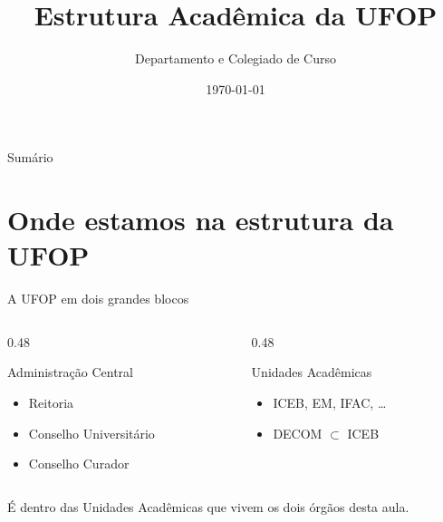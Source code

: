 \documentclass[aspectratio=169]{beamer}
\title{Estrutura Acadêmica da UFOP}
\author{Departamento e Colegiado de Curso}
\date{\today}
\newcommand{\ntc}[1]{\textcolor{mprimary}{#1}}
\begin{document}
\begin{frame}[plain]\titlepage\end{frame}

\begin{frame}{Sumário}
  \tableofcontents
\end{frame}

\section{Onde estamos na estrutura da UFOP}

\begin{frame}{A UFOP em dois grandes blocos}
  \begin{columns}[T,onlytextwidth]
    \begin{column}{0.48\textwidth}
      \begin{block}{Administração Central}
        \begin{itemize}
          \item Reitoria
          \item Conselho Universitário
          \item Conselho Curador
        \end{itemize}
      \end{block}
    \end{column}
    \begin{column}{0.48\textwidth}
      \begin{block}{Unidades Acadêmicas}
        \begin{itemize}
          \item ICEB, EM, IFAC, \ldots
          \item DECOM $\subset$ ICEB
        \end{itemize}
      \end{block}
    \end{column}
  \end{columns}

  \vspace{0.4cm}
   
  \ntc{É dentro das Unidades Acadêmicas que vivem os dois órgãos desta aula.}
\end{frame}
\end{document}
